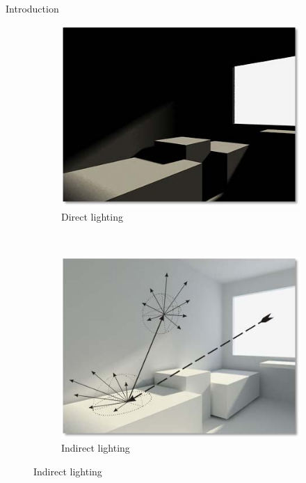 \documentclass[10pt]{beamer}
\begin{document}
{\begin{frame}{Introduction}
  \begin{figure}
    \begin{subfigure}[t]{0.475\textwidth}
      \includegraphics[width=\textwidth]{directlighting}
      \caption*{Direct lighting}
    \end{subfigure}
    ~
    \begin{subfigure}[t]{0.475\textwidth}
      \includegraphics[width=\textwidth]{indirectlighting}
      \caption*{Indirect lighting}
    \end{subfigure}
  \end{figure}
\end{frame}}
\end{document}
